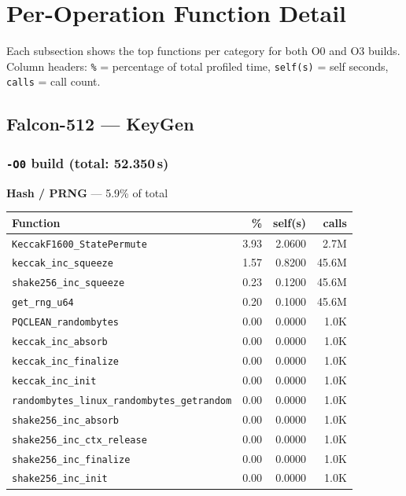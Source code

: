 \documentclass[11pt,a4paper]{article}
\begin{document}
\section{Per-Operation Function Detail}

Each subsection shows the top functions per category
for both O0 and O3 builds. Column headers:
\texttt{\%} = percentage of total profiled time,
\texttt{self(s)} = self seconds,
\texttt{calls} = call count.

\subsection{Falcon-512 --- KeyGen}

\subsubsection*{\texttt{-O0} build (total: 52.350\,s)}

\noindent\colorbox{hashcolor}{\strut \textbf{Hash / PRNG} --- 5.9\% of total}
\vspace{2pt}

\begin{longtable}{p{7.5cm}rrr}
\toprule
Function & \% & self(s) & calls \\
\midrule
\endhead
  \texttt{KeccakF1600\_StatePermute} & 3.93 & 2.0600 & 2.7M \\
  \texttt{keccak\_inc\_squeeze} & 1.57 & 0.8200 & 45.6M \\
  \texttt{shake256\_inc\_squeeze} & 0.23 & 0.1200 & 45.6M \\
  \texttt{get\_rng\_u64} & 0.20 & 0.1000 & 45.6M \\
  \texttt{PQCLEAN\_randombytes} & 0.00 & 0.0000 & 1.0K \\
  \texttt{keccak\_inc\_absorb} & 0.00 & 0.0000 & 1.0K \\
  \texttt{keccak\_inc\_finalize} & 0.00 & 0.0000 & 1.0K \\
  \texttt{keccak\_inc\_init} & 0.00 & 0.0000 & 1.0K \\
  \texttt{randombytes\_linux\_randombytes\_getrandom} & 0.00 & 0.0000 & 1.0K \\
  \texttt{shake256\_inc\_absorb} & 0.00 & 0.0000 & 1.0K \\
  \texttt{shake256\_inc\_ctx\_release} & 0.00 & 0.0000 & 1.0K \\
  \texttt{shake256\_inc\_finalize} & 0.00 & 0.0000 & 1.0K \\
  \texttt{shake256\_inc\_init} & 0.00 & 0.0000 & 1.0K \\
\bottomrule
\end{longtable}
\end{document}
